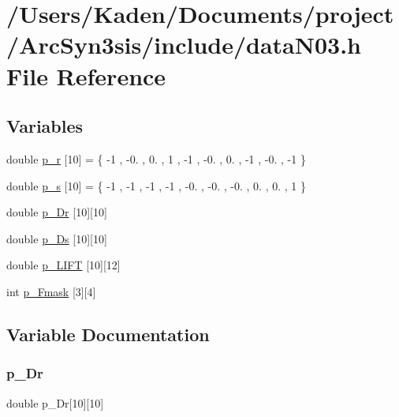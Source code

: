 \hypertarget{a00512}{}\section{/\+Users/\+Kaden/\+Documents/project/\+Arc\+Syn3sis/include/data\+N03.h File Reference}
\label{a00512}
\subsection*{Variables}
\begin{DoxyCompactItemize}
\item 
double \hyperlink{a00512_ad0e413c816dfa121d92ed67c43d35071}{p\+\_\+r} \mbox{[}10\mbox{]} = \{ -\/1 , -\/0. , 0. , 1 , -\/1 , -\/0. , 0. , -\/1 , -\/0. , -\/1 \}
\item 
double \hyperlink{a00512_ab412f40aac46b2e78aceb916a6f1b16f}{p\+\_\+s} \mbox{[}10\mbox{]} = \{ -\/1 , -\/1 , -\/1 , -\/1 , -\/0. , -\/0. , -\/0. , 0. , 0. , 1 \}
\item 
double \hyperlink{a00512_a77cc0f5d6b095d707a8f44917daa5848}{p\+\_\+\+Dr} \mbox{[}10\mbox{]}\mbox{[}10\mbox{]}
\item 
double \hyperlink{a00512_ada19a548901d8b04fd5c62d0e30d53f7}{p\+\_\+\+Ds} \mbox{[}10\mbox{]}\mbox{[}10\mbox{]}
\item 
double \hyperlink{a00512_aefff047c0c87461150b141f54f837e81}{p\+\_\+\+L\+I\+FT} \mbox{[}10\mbox{]}\mbox{[}12\mbox{]}
\item 
int \hyperlink{a00512_a9e8002d4e70ec8468d74e26db0e92bda}{p\+\_\+\+Fmask} \mbox{[}3\mbox{]}\mbox{[}4\mbox{]}
\end{DoxyCompactItemize}


\subsection{Variable Documentation}
\mbox{\label{a00512_a77cc0f5d6b095d707a8f44917daa5848}} 
\subsubsection{\texorpdfstring{p\+\_\+\+Dr}{p\_Dr}}
{\footnotesize\ttfamily double p\+\_\+\+Dr\mbox{[}10\mbox{]}\mbox{[}10\mbox{]}}

